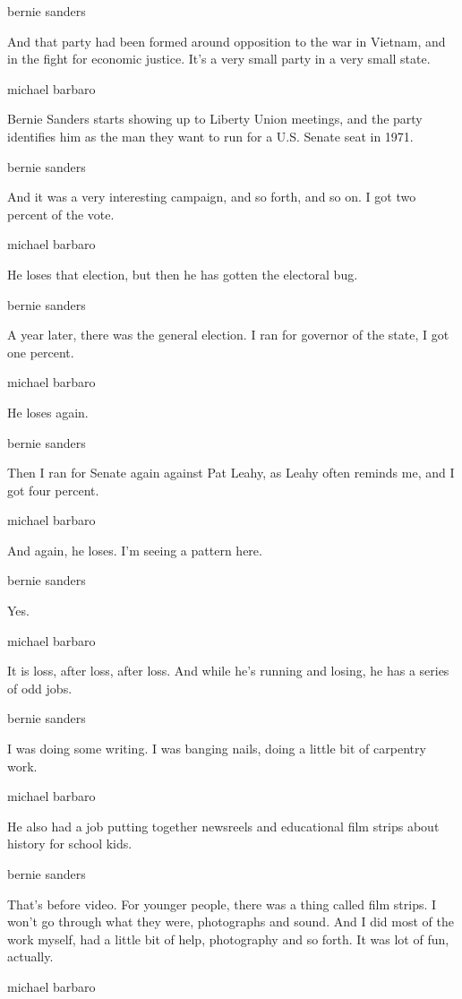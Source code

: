 bernie sanders

And that party had been formed around opposition to the war in Vietnam,
and in the fight for economic justice. It's a very small party in a very
small state.

michael barbaro

Bernie Sanders starts showing up to Liberty Union meetings, and the
party identifies him as the man they want to run for a U.S. Senate seat
in 1971.

bernie sanders

And it was a very interesting campaign, and so forth, and so on. I got
two percent of the vote.

michael barbaro

He loses that election, but then he has gotten the electoral bug.

bernie sanders

A year later, there was the general election. I ran for governor of the
state, I got one percent.

michael barbaro

He loses again.

bernie sanders

Then I ran for Senate again against Pat Leahy, as Leahy often reminds
me, and I got four percent.

michael barbaro

And again, he loses. I'm seeing a pattern here.

bernie sanders

Yes.

michael barbaro

It is loss, after loss, after loss. And while he's running and losing,
he has a series of odd jobs.

bernie sanders

I was doing some writing. I was banging nails, doing a little bit of
carpentry work.

michael barbaro

He also had a job putting together newsreels and educational film strips
about history for school kids.

bernie sanders

That's before video. For younger people, there was a thing called film
strips. I won't go through what they were, photographs and sound. And I
did most of the work myself, had a little bit of help, photography and
so forth. It was lot of fun, actually.

michael barbaro

